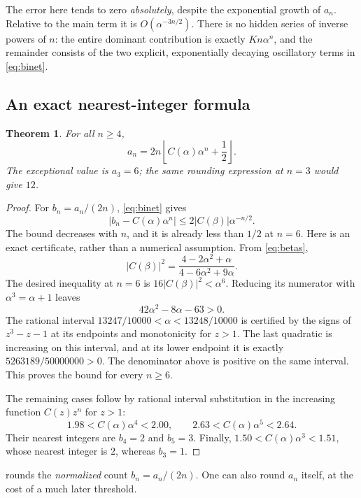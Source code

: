 \documentclass[11pt,letterpaper]{article}
\numberwithin{equation}{section}
\newtheorem{theorem}{Theorem}[section]
\theoremstyle{definition}
\newcommand{\1}{\mathbf 1}
\begin{document}
The error here tends to zero \emph{absolutely}, despite the exponential growth
of $a_n$. Relative to the main term it is $O(\alpha^{-3n/2})$.
There is no hidden series of inverse powers of $n$: the entire dominant
contribution is exactly $Kn\alpha^n$, and the remainder consists of the two
explicit, exponentially decaying oscillatory terms in \eqref{eq:binet}.

\subsection{An exact nearest-integer formula}
\begin{theorem}\label{thm:rounding}
For all $n\ge4$,
\begin{equation}\label{eq:rounding}
 \boxed{a_n=2n\left\lfloor C(\alpha)\alpha^n+\frac12\right\rfloor.}
\end{equation}
The exceptional value is $a_3=6$; the same rounding expression at $n=3$
would give $12$.
\end{theorem}
\begin{proof}
For $b_n=a_n/(2n)$, \eqref{eq:binet} gives
\[
 |b_n-C(\alpha)\alpha^n|\le2|C(\beta)|\alpha^{-n/2}.
\]
The bound decreases with $n$, and it is already less than $1/2$ at $n=6$.
Here is an exact certificate, rather than a numerical assumption. From
\eqref{eq:betas},
\[
 |C(\beta)|^2=
 \frac{4-2\alpha^2+\alpha}{4-6\alpha^2+9\alpha}.
\]
The desired inequality at $n=6$ is
$16|C(\beta)|^2<\alpha^6$. Reducing its numerator with
$\alpha^3=\alpha+1$ leaves
\[
 42\alpha^2-8\alpha-63>0.
\]
The rational interval
$13247/10000<\alpha<13248/10000$ is certified by the signs of
$z^3-z-1$ at its endpoints and monotonicity for $z>1$. The last quadratic is
increasing on this interval, and at its lower endpoint it is exactly
$5263189/50000000>0$. The denominator above is positive on the same interval.
This proves the bound for every $n\ge6$.

The remaining cases follow by rational interval substitution in the increasing
function $C(z)z^n$ for $z>1$:
\[
 1.98<C(\alpha)\alpha^4<2.00,\qquad
 2.63<C(\alpha)\alpha^5<2.64.
\]
Their nearest integers are $b_4=2$ and $b_5=3$. Finally,
$1.50<C(\alpha)\alpha^3<1.51$, whose nearest integer is $2$, whereas $b_3=1$.
\end{proof}

 rounds the \emph{normalized} count $b_n=a_n/(2n)$.
One can also round $a_n$ itself, at the cost of a much later threshold.
\end{document}
